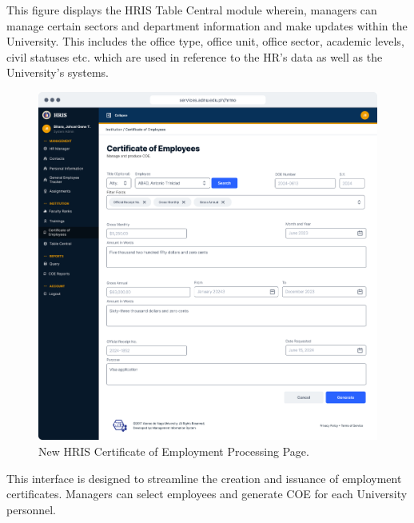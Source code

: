     This figure displays the HRIS Table Central module wherein, managers can manage certain sectors and department information and make updates within the University. This includes the office type, office unit, office sector, academic levels, civil statuses etc. which are used in reference to the HR's data as well as the University's systems.

    \begin{figure}[H]
        \centering
        \includegraphics[width=1\linewidth]{figures/app/coe.png}
        \caption{New HRIS Certificate of Employment Processing Page.}
        \label{fig:app-coe}
    \end{figure}

    This interface is designed to streamline the creation and issuance of employment certificates. Managers can select employees and generate COE for each University personnel.

